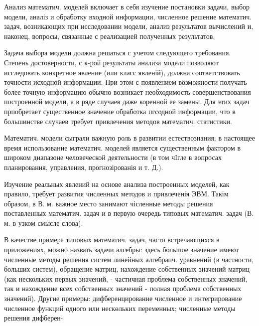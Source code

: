 \documentclass[10pt]{article}
\begin{document}
Анализ математич. моделей включает в себя изучение постановки задачи, выбор модели, аналіз и обработку входной информации, численное решение математич. задач, возникающих при исследовании модели, анализ результатов вычислений и, наконец, вопросы, связанные с реализацией полученных результатов.



Задача выбора модели должна решаться с учетом следующего требования. Степень достоверности, с к-рой результаты анализа модели позволяют исследовать конкретное явление (или класс явленій), должна соответствовать точности исходной информации. При этом с появлением возможности получать более точную информацию обычно возникает необходимость совершенствования построенной модели, а в ряде случаев даже коренной ее замены. Для этих задач прпобретает существенное значение обработка пгсодной информации, что в большинстве случаев требует привлечения методов математич. статистики.



Математич. модели сыграли важную роль в развитии естествознания; в настоящее время использование математич. моделей является существенным фактором в широком диапазоне человеческой деятельности (в том чІгле в вопросах планирования, управления, прогнозірованія и т. Д.).



Изучение реальных явлений на основе анализа построенных моделей, как правило, требует развития численных методов и привлеченія ЭВМ. Такім образом, в В. м. важное место занимают чісленные методы решения поставленных математич. задач и в первую очередь типовых математич. задач (В. м. в узком смысле слова).



В качестве примера типовых математич. задач, часто встречающихся в приложениях, можно назвать задачи алгебры: здесь большое значение имеют численные методы решения систем линейных алгебрапч. уравнений (в частности, больших систем), обращение матриц, нахождение собственных значений матриц (как нескольких первых значений, - частичная проблема собственных значений, так и нахождение всех собственных значений - полная проблема собственных значений). Другие примеры: дифберенцирование численное и интегрирование численное функций одного или нескөльких переменных; численные методы решения дифберен-
\end{document}
